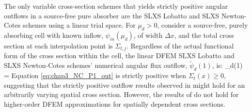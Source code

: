 %
The only variable cross-section schemes that yields strictly positive angular outflows in a source-free pure absorber are the SLXS Lobatto and SLXS Newton-Cotes schemes using a linear trial space.
For $\mu_d > 0$, consider a source-free, purely absorbing cell with known inflow, $\psi_{in}(\mu_d)$, of width $\Delta x$, and the total cross section at each interpolation point is $\Sigma_{t,j}$.
Regardless of the actual functional form of the cross section within the cell, the linear DFEM SLXS Lobatto and SLXS Newton-Cotes schemes'
numerical angular flux outflow, $\widetilde{\psi}_d(1)$, is:
\benum
\label{eq:chap3_NC_P1_out}
\widetilde{\psi}_d(1) =  \pep
\eenum
Equation \ref{eq:chap3_NC_P1_out} is strictly positive when $\Sigma_t(x) \geq 0$, suggesting that the strictly positive outflow results observed in \cite{part_1_paper} might hold for an arbitrarily varying spatial cross section.
However, the results of \cite{part_1_paper} do not hold for higher-order DFEM approximations for spatially dependent cross sections.  

